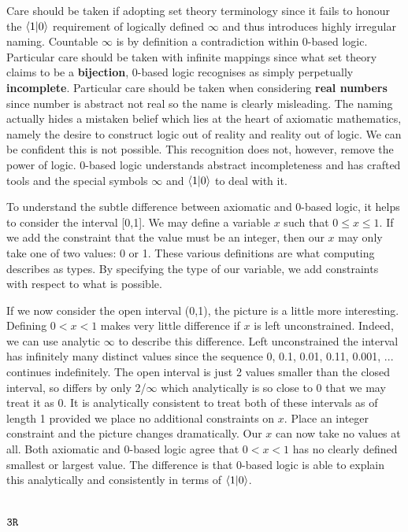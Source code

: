 \documentclass{article}
\begin{document}
Care should be taken if adopting set theory terminology since it fails to honour the $\langle 1 | 0 \rangle$ requirement of logically defined $\infty$ and thus introduces highly irregular naming. Countable $\infty$ is by definition a contradiction within 0-based logic. Particular care should be taken with infinite mappings since what set theory claims to be a \textbf{bijection}, 0-based logic recognises as simply perpetually \textbf{incomplete}. Particular care should be taken when considering \textbf{real numbers} since number is abstract not real so the name is clearly misleading. The naming actually hides a mistaken belief which lies at the heart of axiomatic mathematics, namely the desire to construct logic out of reality and reality out of logic. We can be confident this is not possible. This recognition does not, however, remove the power of logic. 0-based logic understands abstract incompleteness and has crafted tools and the special symbols $\infty$ and $\langle 1 | 0 \rangle$ to deal with it.

To understand the subtle difference between axiomatic and 0-based logic, it helps to consider the interval [0,1]. We may define a variable \( x \) such that \( 0 \le x \le 1 \). If we add the constraint that the value must be an integer, then our \( x \) may only take one of two values: 0 or 1. These various definitions are what computing describes as types. By specifying the type of our variable, we add constraints with respect to what is possible.

If we now consider the open interval (0,1), the picture is a little more interesting. Defining \( 0 < x < 1 \) makes very little difference if \( x \) is left unconstrained. Indeed, we can use analytic $\infty$ to describe this difference. Left unconstrained the interval has infinitely many distinct values since the sequence 0, 0.1, 0.01, 0.11, 0.001, ... continues indefinitely. The open interval is just 2 values smaller than the closed interval, so differs by only 2/$\infty$ which analytically is so close to 0 that we may treat it as 0. It is analytically consistent to treat both of these intervals as of length 1 provided we place no additional constraints on \( x \). Place an integer constraint and the picture changes dramatically. Our \( x \) can now take no values at all. Both axiomatic and 0-based logic agree that \( 0 < x < 1 \) has no clearly defined smallest or largest value. The difference is that 0-based logic is able to explain this analytically and consistently in terms of $\langle 1 | 0 \rangle$.

\section*{$\texttt{3R}$}
\end{document}
